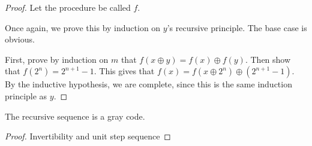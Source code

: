 \begin{proof}
    Let the procedure be called $f$.

    Once again, we prove this by induction on $y$'s recursive principle. The base case is obvious.

    First, prove by induction on $m$ that $f(x \oplus y) = f(x) \oplus f(y)$. Then show that
    $f(2^n) = 2^{n+1} - 1$. This gives that $f(x) = f(x \oplus 2^n) \oplus (2^{n+1} - 1)$.
    By the inductive hypothesis, we are complete, since this is the same induction principle as $y$.
\end{proof}

\begin{theorem}
    \label{thm:recursive_is_gray_code}
    The recursive sequence is a gray code.
\end{theorem}

\begin{proof}
    Invertibility and unit step sequence 
\end{proof}

